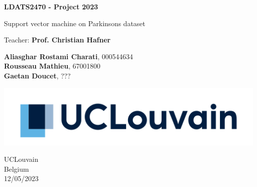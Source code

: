 \begin{titlepage}
	\begin{center}
	  \vspace*{1cm}
		  
	  \Huge
	  \textbf{LDATS2470 - Project 2023}
		  
	  \vspace{0.5cm}
	  \LARGE
	  Support vector machine on Parkinsons dataset
		  
	  \vspace{2.5cm}

	  \Large
	  Teacher: \textbf{Prof. Christian Hafner}
      \vspace*{10mm}
	  
	  \Large
	  \textbf{Aliasghar Rostami Charati}, 000544634 \\
	  \textbf{Rousseau Mathieu}, 67001800 \\
	  \textbf{Gaetan Doucet}, ???
		  
	  \vfill
		  
	  \vspace{0.8cm}
		  
	  \includegraphics[width=\textwidth]{figures/logo_ucl.png}
  
	  \vspace{0.8cm}
		  
	  \Large
	  UCLouvain \\
	  Belgium \\
	  12/05/2023
	\end{center}
  \end{titlepage}